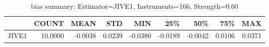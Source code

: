 \begin{table}[ht]
\centering
\caption{bias summary: Estimator=JIVE1, Instruments=166, Strength=0.60}
\begin{tabular}{lrrrrrrrr}
\toprule
 & COUNT & MEAN & STD & MIN & 25\% & 50\% & 75\% & MAX \\
\midrule
JIVE1 & 10.0000 & -0.0038 & 0.0239 & -0.0380 & -0.0189 & -0.0042 & 0.0106 & 0.0371 \\
\bottomrule
\end{tabular}
\end{table}
